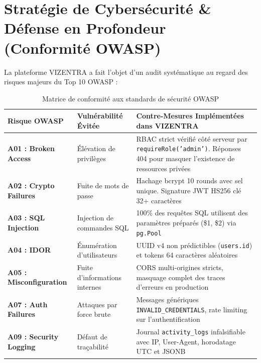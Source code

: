 \documentclass[11pt,a4paper]{article}
\begin{document}
\section{Stratégie de Cybersécurité \& Défense en Profondeur (Conformité OWASP)}

La plateforme VIZENTRA a fait l'objet d'un audit systématique au regard des risques majeurs du Top 10 OWASP :

\begin{table}[h!]
\centering
\small
\renewcommand{\arraystretch}{1.2}
\begin{tabularx}{\textwidth}{>{\bfseries}p{2.8cm} p{3.2cm} X}
    \toprule
    \rowcolor{tableheader}
    \color{white}Risque OWASP & \color{white}Vulnérabilité Évitée & \color{white}Contre-Mesures Implémentées dans VIZENTRA \\
    \midrule
    A01 : Broken Access & Élévation de privilèges & RBAC strict vérifié côté serveur par \texttt{requireRole('admin')}. Réponses 404 pour masquer l'existence de ressources privées \\
    \rowcolor{tablerowalt}
    A02 : Crypto Failures & Fuite de mots de passe & Hachage bcrypt 10 rounds avec sel unique. Signature JWT HS256 clé 32+ caractères \\
    A03 : SQL Injection & Injection de commandes SQL & 100\% des requêtes SQL utilisent des paramètres préparés (\$1, \$2) via \texttt{pg.Pool} \\
    \rowcolor{tablerowalt}
    A04 : IDOR & Énumération d'utilisateurs & UUID v4 non prédictibles (\texttt{users.id}) et tokens 64 caractères aléatoires \\
    A05 : Misconfiguration & Fuite d'informations internes & CORS multi-origines stricts, masquage complet des traces d'erreurs en production \\
    \rowcolor{tablerowalt}
    A07 : Auth Failures & Attaques par force brute & Messages génériques \texttt{INVALID\_CREDENTIALS}, rate limiting sur l'authentification \\
    A09 : Security Logging & Défaut de traçabilité & Journal \texttt{activity\_logs} infalsifiable avec IP, User-Agent, horodatage UTC et JSONB \\
    \bottomrule
\end{tabularx}
\caption{Matrice de conformité aux standards de sécurité OWASP}
\end{table}
\end{document}
